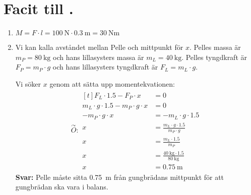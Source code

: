 \documentclass[11pt]{article}
\begin{document}
\raggedright

\section*{Facit till \lessonNumber. \lessonName}
\begin{enumerate}[itemsep=2em]
        \item
              \begin{minipage}[t]{0.5\textwidth}
                      $M = F \cdot l = \SI{100}{\newton} \cdot \SI{0.3}{\meter} = \SI{30}{\newton\metre}$
              \end{minipage}
              \hspace{1em}
              \begin{adjustbox}{valign=t}
                      
              \end{adjustbox}
        \item
              Vi kan kalla avståndet mellan Pelle och mittpunkt för $x$. Pelles massa är $m_P = \SI{80}{\kilogram}$ och hans lillasysters massa är $m_L = \SI{40}{\kilogram}$. Pelles tyngdkraft är $F_P = m_P \cdot g$ och hans lillasysters tyngdkraft är $F_L = m_L \cdot g$.

              Vi söker $x$ genom att sätta upp momentekvationen:
              \begin{align*}
                      \overset{\curvearrowright}{O} : \begin{aligned}[t]
                                                              F_L \cdot 1.5 - F_P \cdot x                 & = 0                                                       \\
                                                              m_L \cdot g \cdot 1.5 - m_P \cdot g \cdot x & = 0                                                       \\
                                                              -m_P \cdot g \cdot x                        & = -m_L \cdot g \cdot 1.5                                  \\
                                                              x                                           & = \frac{m_L \cdot g \cdot 1.5}{m_P \cdot g}               \\
                                                              x                                           & = \frac{m_L \cdot 1.5}{m_P}                               \\
                                                              x                                           & = \frac{\SI{40}{\kilogram} \cdot 1.5}{\SI{80}{\kilogram}} \\
                                                              x                                           & = \SI{0.75}{\meter}
                                                      \end{aligned}
              \end{align*}
              \textbf{Svar:} Pelle måste sitta \SI{0.75}{\meter} från gungbrädans mittpunkt för att gungbrädan ska vara i balans.


\end{enumerate}
\end{document}
